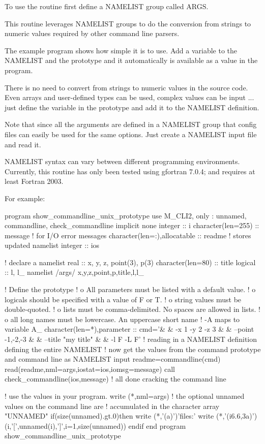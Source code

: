 \begin{DoxyVerb} To use the routine first define a NAMELIST group called ARGS.

 This routine leverages NAMELIST groups to do the conversion from
 strings to numeric values required by other command line parsers.

 The example program shows how simple it is to use. Add a variable to
 the NAMELIST and the prototype and it automatically is available as
 a value in the program.

 There is no need to convert from strings to numeric values in the
 source code. Even arrays and user-defined types can be used, complex
 values can be input ... just define the variable in the prototype
 and add it to the NAMELIST definition.

 Note that since all the arguments are defined in a NAMELIST group that
 config files can easily be used for the same options. Just create
 a NAMELIST input file and read it.

 NAMELIST syntax can vary between different programming environments.
 Currently, this routine has only been tested using gfortran 7.0.4;
 and requires at least Fortran 2003.

 For example:

     program show_commandline_unix_prototype
        use M_CLI2,  only : unnamed, commandline, check_commandline
        implicit none
        integer                      :: i
        character(len=255)           :: message ! for I/O error messages
        character(len=:),allocatable :: readme  ! stores updated namelist
        integer                      :: ios

     ! declare a namelist
        real               :: x, y, z, point(3), p(3)
        character(len=80)  :: title
        logical            :: l, l_
        namelist /args/ x,y,z,point,p,title,l,l_

     ! Define the prototype
     !  o All parameters must be listed with a default value.
     !  o logicals should be specified with a value of F or T.
     !  o string values  must be double-quoted.
     !  o lists must be comma-delimited. No spaces are allowed in lists.
     !  o all long names must be lowercase. An uppercase short name
     !    -A maps to variable A_
        character(len=*),parameter  :: cmd='&
        & -x 1 -y 2 -z 3     &
        & --point -1,-2,-3   &
        & --title "my title" &
        & -l F -L F'
        ! reading in a NAMELIST definition defining the entire NAMELIST
        ! now get the values from the command prototype and command line as NAMELIST input
        readme=commandline(cmd)
        read(readme,nml=args,iostat=ios,iomsg=message)
        call check_commandline(ios,message)
        ! all done cracking the command line

        ! use the values in your program.
        write (*,nml=args)
        ! the optional unnamed values on the command line are
        ! accumulated in the character array "UNNAMED"
        if(size(unnamed).gt.0)then
           write (*,'(a)')'files:'
           write (*,'(i6.6,3a)')(i,'[',unnamed(i),']',i=1,size(unnamed))
        endif
     end program show_commandline_unix_prototype
\end{DoxyVerb}


